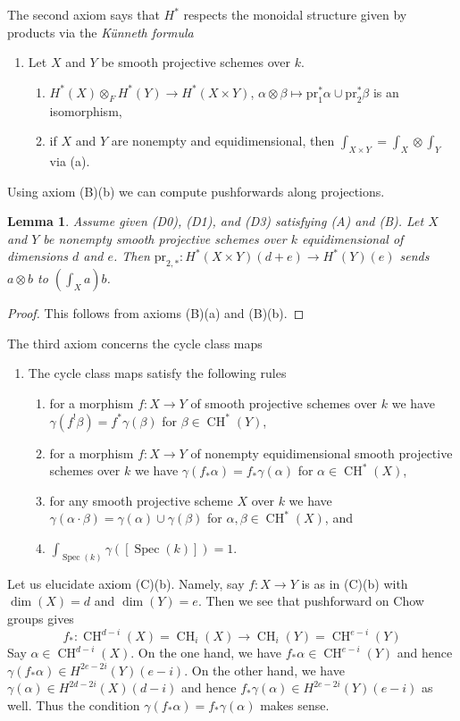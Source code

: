 \documentclass{stacks-project}
\theoremstyle{plain}
\newtheorem{lemma}[subsection]{Lemma}
\theoremstyle{definition}
\theoremstyle{remark}
\numberwithin{equation}{subsection}
\def\Spec{\mathop{\mathrm{Spec}}}
\def\CH{\mathop{\mathrm{CH}}\nolimits}
\begin{document}
\noindent
The second axiom says that $H^*$ respects the monoidal structure
given by products via the {\it K\"unneth formula}
\begin{enumerate}
\item[(B)] Let $X$ and $Y$ be smooth projective schemes over $k$.
\begin{enumerate}
\item $H^*(X) \otimes_F H^*(Y) \to H^*(X \times Y)$,
$\alpha \otimes \beta \mapsto \text{pr}_1^*\alpha \cup \text{pr}_2^*\beta$
is an isomorphism,
\item if $X$ and $Y$ are nonempty and equidimensional, then
$\int_{X \times Y} = \int_X \otimes \int_Y$ via (a).
\end{enumerate}
\end{enumerate}
Using axiom (B)(b) we can compute pushforwards along projections.

\begin{lemma}
\label{lemma-pr2star}
Assume given (D0), (D1), and (D3) satisfying (A) and (B).
Let $X$ and $Y$ be nonempty smooth projective schemes over $k$
equidimensional of dimensions $d$ and $e$. Then
$\text{pr}_{2, *} : H^*(X \times Y)(d + e) \to H^*(Y)(e)$ sends
$a \otimes b$ to $(\int_X a) b$.
\end{lemma}

\begin{proof}
This follows from axioms (B)(a) and (B)(b).
\end{proof}

\noindent
The third axiom concerns the cycle class maps
\begin{enumerate}
\item[(C)] The cycle class maps satisfy the following rules
\begin{enumerate}
\item for a morphism $f : X \to Y$ of smooth projective schemes over
$k$ we have $\gamma(f^!\beta) = f^*\gamma(\beta)$ for $\beta \in \CH^*(Y)$,
\item for a morphism $f : X \to Y$ of nonempty
equidimensional smooth projective schemes over $k$ we have
$\gamma(f_*\alpha) = f_*\gamma(\alpha)$ for $\alpha \in \CH^*(X)$,
\item for any smooth projective scheme $X$ over $k$ we have
$\gamma(\alpha \cdot \beta) = \gamma(\alpha) \cup \gamma(\beta)$
for $\alpha, \beta \in \CH^*(X)$, and
\item $\int_{\Spec(k)} \gamma([\Spec(k)]) = 1$.
\end{enumerate}
\end{enumerate}
Let us elucidate axiom (C)(b). Namely, say $f : X \to Y$ is
as in (C)(b) with $\dim(X) = d$ and $\dim(Y) = e$. Then we
see that pushforward on Chow groups gives
$$
f_* : \CH^{d - i}(X) = \CH_i(X) \to \CH_i(Y) = \CH^{e - i}(Y)
$$
Say $\alpha \in \CH^{d - i}(X)$. On the one hand, we have
$f_*\alpha \in \CH^{e - i}(Y)$ and hence
$\gamma(f_*\alpha) \in H^{2e - 2i}(Y)(e - i)$.
On the other hand, we have
$\gamma(\alpha) \in H^{2d - 2i}(X)(d - i)$ and hence
$f_*\gamma(\alpha) \in H^{2e - 2i}(Y)(e - i)$ as well.
Thus the condition $\gamma(f_*\alpha) = f_*\gamma(\alpha)$ makes sense.
\end{document}
